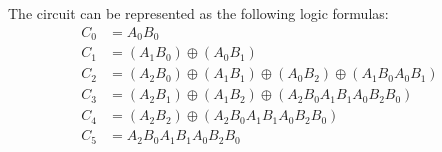 \par The circuit can be represented as the following logic formulas:
\begin{align*}
C_0&=A_0B_0\\
C_1&=(A_1B_0)\oplus(A_0B_1)\\
C_2&=(A_2B_0)\oplus(A_1B_1)\oplus(A_0B_2)\oplus(A_1B_0A_0B_1)\\
C_3&=(A_2B_1)\oplus(A_1B_2)\oplus(A_2B_0A_1B_1A_0B_2B_0)\\
C_4&=(A_2B_2)\oplus(A_2B_0A_1B_1A_0B_2B_0)\\
C_5&=A_2B_0A_1B_1A_0B_2B_0
\end{align*}
\vspace{-2em}
